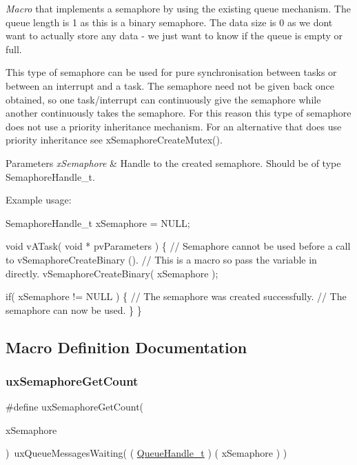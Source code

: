 {\itshape Macro} that implements a semaphore by using the existing queue mechanism. The queue length is 1 as this is a binary semaphore. The data size is 0 as we don\textquotesingle{}t want to actually store any data -\/ we just want to know if the queue is empty or full.

This type of semaphore can be used for pure synchronisation between tasks or between an interrupt and a task. The semaphore need not be given back once obtained, so one task/interrupt can continuously \textquotesingle{}give\textquotesingle{} the semaphore while another continuously \textquotesingle{}takes\textquotesingle{} the semaphore. For this reason this type of semaphore does not use a priority inheritance mechanism. For an alternative that does use priority inheritance see x\+Semaphore\+Create\+Mutex().


\begin{DoxyParams}{Parameters}
{\em x\+Semaphore} & Handle to the created semaphore. Should be of type Semaphore\+Handle\+\_\+t.\\
\hline
\end{DoxyParams}
Example usage\+: 
\begin{DoxyPre}
SemaphoreHandle\_t xSemaphore = NULL;\end{DoxyPre}



\begin{DoxyPre}void vATask( void * pvParameters )
\{
   // Semaphore cannot be used before a call to vSemaphoreCreateBinary ().
   // This is a macro so pass the variable in directly.
   vSemaphoreCreateBinary( xSemaphore );\end{DoxyPre}



\begin{DoxyPre}   if( xSemaphore != NULL )
   \{
       // The semaphore was created successfully.
       // The semaphore can now be used.
   \}
\}
\end{DoxyPre}
 

\subsection{Macro Definition Documentation}
\mbox{\label{group___semaphores_gaa26a3d7cf9b5595a652daeb7f81229f3}} 
\subsubsection{\texorpdfstring{ux\+Semaphore\+Get\+Count}{uxSemaphoreGetCount}}
{\footnotesize\ttfamily \#define ux\+Semaphore\+Get\+Count(\begin{DoxyParamCaption}\item[{}]{x\+Semaphore }\end{DoxyParamCaption})~ux\+Queue\+Messages\+Waiting( ( \hyperlink{group___queue_management_gaaf19d499892a4ce1409326ece00f5264}{Queue\+Handle\+\_\+t} ) ( x\+Semaphore ) )}

